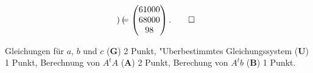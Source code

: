 \begin{loesung}
\begin{align*}
\begin{pmatrix}
\end{pmatrix}=\begin{pmatrix}61000\\68000\\98\end{pmatrix}.
\qedhere
\end{align*}
\end{loesung}

\begin{bewertung}
Gleichungen für $a$, $b$ und $c$ ({\bf G}) 2 Punkt,
"Uberbestimmtes Gleichungssystem ({\bf U}) 1 Punkt,
Berechnung von $A^tA$ ({\bf A}) 2 Punkt,
Berechung von $A^tb$ ({\bf B}) 1 Punkt.
\end{bewertung}

